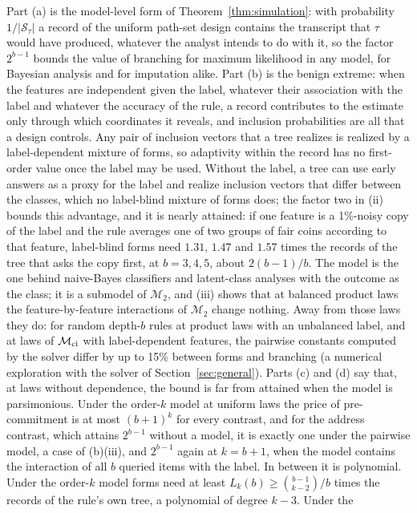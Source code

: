 Part (a) is the model-level form of Theorem~\ref{thm:simulation}: with
probability $1/|\mathcal S_\tau|$ a record of the uniform path-set design
contains the transcript that $\tau$ would have produced, whatever the analyst
intends to do with it, so the factor $2^{b-1}$ bounds the value of branching
for maximum likelihood in any model, for Bayesian analysis and for
imputation alike. Part (b) is the benign extreme: when the features are independent given the label, whatever their association with the label and whatever the accuracy of the rule, a record contributes to the estimate only through which coordinates it reveals, and inclusion probabilities are all that a design controls. Any pair of inclusion vectors that a tree realizes is realized by a label-dependent mixture of forms, so adaptivity within the record has no first-order value once the label may be used. Without the label, a tree can use early answers as a proxy for the label and realize inclusion vectors that differ between the classes, which no label-blind mixture of forms does; the factor two in (ii) bounds this advantage, and it is nearly attained: if one feature is a 1\%-noisy copy of the label and the rule averages one of two groups of fair coins according to that feature, label-blind forms need $1.31$, $1.47$ and $1.57$ times the records of the tree that asks the copy first, at $b=3,4,5$, about $2(b-1)/b$. The model is the one behind naive-Bayes classifiers and latent-class analyses with the outcome as the class; it is a submodel of $\mathcal M_2$, and (iii) shows that at balanced product laws the feature-by-feature interactions of $\mathcal M_2$ change nothing. Away from those laws they do: for random depth-$b$ rules at product laws with an unbalanced label, and at laws of $\mathcal M_{\rm ci}$ with label-dependent features, the pairwise constants computed by the solver differ by up to 15\% between forms and branching (a numerical exploration with the solver of Section~\ref{sec:general}). Parts (c) and (d) say that, at laws without dependence,
the bound is far from attained when the model is parsimonious. Under the
order-$k$ model at uniform laws the price of pre-commitment is at most
$(b+1)^k$ for every contrast, and for the address contrast, which attains
$2^{b-1}$ without a model, it is exactly one under the pairwise model, a case of (b)(iii), and
$2^{b-1}$ again at $k=b+1$, when the model contains the interaction of all
$b$ queried items with the label. In between it is polynomial. Under the
order-$k$ model forms need at least $L_k(b)\ge\binom{b-1}{k-2}/b$ times the
records of the rule's own tree, a polynomial of degree $k-3$. Under the
